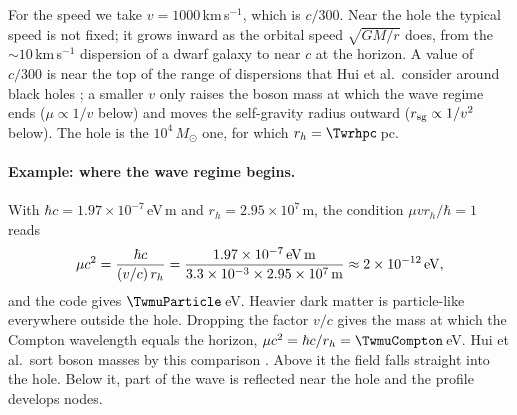 For the speed we take $v=1000$\,km\,s$^{-1}$, which is $c/300$. Near the hole the typical speed is not fixed; it grows inward as the orbital speed $\sqrt{GM/r}$ does, from the $\sim10$\,km\,s$^{-1}$ dispersion of a dwarf galaxy to near $c$ at the horizon. A value of $c/300$ is near the top of the range of dispersions that Hui et al.\ consider around black holes \cite[eq.~(1.5)]{HuiKabat2019}; a smaller $v$ only raises the boson mass at which the wave regime ends ($\mu\propto1/v$ below) and moves the self-gravity radius outward ($r_{\rm sg}\propto1/v^2$ below). The hole is the $10^4\,M_\odot$ one, for which $r_h=\Twrhpc$\,pc.

\paragraph{Example: where the wave regime begins.}
With $\hbar c=1.97\times10^{-7}$\,eV\,m and $r_h=2.95\times10^7$\,m, the condition $\mu v r_h/\hbar=1$ reads
\[
  \mu c^2=\frac{\hbar c}{(v/c)\,r_h}=\frac{1.97\times10^{-7}\,{\rm eV\,m}}{3.3\times10^{-3}\times2.95\times10^7\,{\rm m}}\approx2\times10^{-12}\,{\rm eV},
\]
and the code gives $\TwmuParticle$\,eV. Heavier dark matter is particle-like everywhere outside the hole. Dropping the factor $v/c$ gives the mass at which the Compton wavelength equals the horizon, $\mu c^2=\hbar c/r_h=\TwmuCompton$\,eV. Hui et al.\ sort boson masses by this comparison \cite[Sec.~1]{HuiKabat2019}. Above it the field falls straight into the hole. Below it, part of the wave is reflected near the hole and the profile develops nodes.


